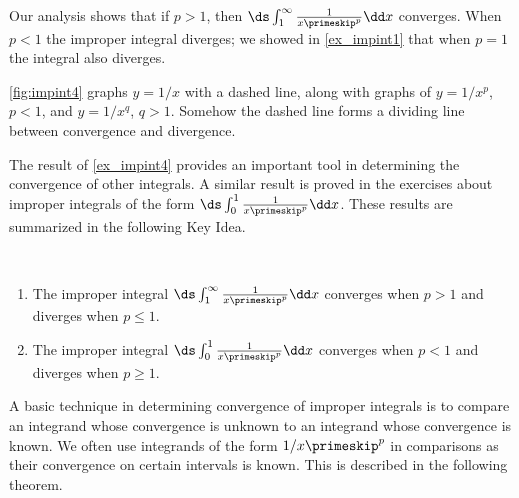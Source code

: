 \begin{example}
Our analysis shows that if $p>1$, then $\ds\int_1^\infty \frac1{x\primeskip^p}\dd x $ converges. When $p<1$ the improper integral diverges; we showed in \autoref{ex_impint1} that when $p=1$ the integral also diverges. 

\autoref{fig:impint4} graphs $y=1/x$ with a dashed line, along with graphs of $y=1/x^p$, $p<1$, and $y=1/x^q$, $q>1$. Somehow the dashed line forms a dividing line between convergence and divergence. %
\end{example}

The result of \autoref{ex_impint4} provides an important tool in determining the convergence of other integrals. A similar result is proved in the exercises about improper integrals of the form $\ds \int_0^1\frac1{x\primeskip^p}\dd x$. These results are summarized in the following Key Idea.

{
\begin{keyidea}\label{idea:impint1}%
\mbox{}\\[-1.5\baselineskip]\parbox[t]{\linewidth}{%
\begin{enumerate}
\item		The improper integral $\ds \int_1^\infty\frac1{x\primeskip^p}\dd x$ converges when $p>1$ and diverges when $p\leq 1.$
\item		The improper integral $\ds \int_0^1\frac1{x\primeskip^p}\dd x$ converges when $p<1$ and diverges when $p\geq 1.$
\end{enumerate}}
\end{keyidea}}

A basic technique in determining convergence of improper integrals is to compare an integrand whose convergence is unknown to an integrand whose convergence is known. We often use integrands of the form $1/x\primeskip^p$ in comparisons as their convergence on certain intervals is known. This is described in the following theorem.


